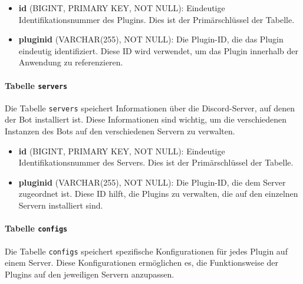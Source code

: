 \begin{itemize}
\item
  \textbf{id} (BIGINT, PRIMARY KEY, NOT NULL): Eindeutige Identifikationsnummer des Plugins. Dies ist der Primärschlüssel der Tabelle.
\item
  \textbf{pluginid} (VARCHAR(255), NOT NULL): Die Plugin-ID, die das Plugin eindeutig identifiziert. Diese ID wird verwendet, um das Plugin innerhalb der Anwendung zu referenzieren.
\end{itemize}

\paragraph{\texorpdfstring{Tabelle \texttt{servers}}{Tabelle servers}}\label{tabelle-servers}

Die Tabelle \texttt{servers} speichert Informationen über die Discord-Server, auf denen der Bot installiert ist. Diese Informationen sind wichtig, um die verschiedenen Instanzen des Bots auf den verschiedenen Servern zu verwalten.

\begin{itemize}
\item
  \textbf{id} (BIGINT, PRIMARY KEY, NOT NULL): Eindeutige Identifikationsnummer des Servers. Dies ist der Primärschlüssel der Tabelle.
\item
  \textbf{pluginid} (VARCHAR(255), NOT NULL): Die Plugin-ID, die dem Server zugeordnet ist. Diese ID hilft, die Plugins zu verwalten, die auf den einzelnen Servern installiert sind.
\end{itemize}

\paragraph{\texorpdfstring{Tabelle \texttt{configs}}{Tabelle configs}}\label{tabelle-configs}

Die Tabelle \texttt{configs} speichert spezifische Konfigurationen für jedes Plugin auf einem Server. Diese Konfigurationen ermöglichen es, die Funktionsweise der Plugins auf den jeweiligen Servern anzupassen.

